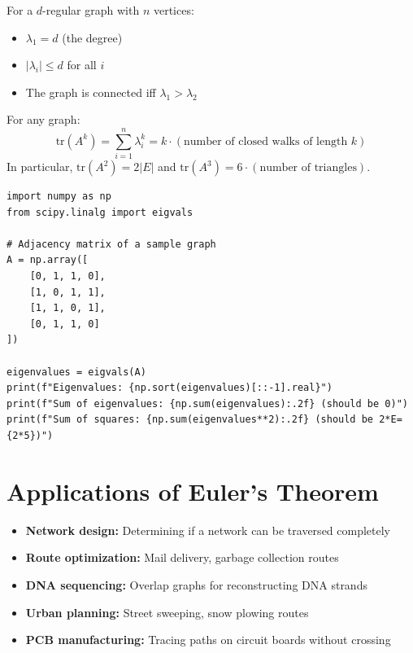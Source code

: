 \begin{theorem}
For a $d$-regular graph with $n$ vertices:
\begin{itemize}
\item $\lambda_1 = d$ (the degree)
\item $|\lambda_i| \leq d$ for all $i$
\item The graph is connected iff $\lambda_1 > \lambda_2$
\end{itemize}
\end{theorem}

\begin{theorem}
For any graph:
\[
\text{tr}(A^k) = \sum_{i=1}^{n} \lambda_i^k = k \cdot (\text{number of closed walks of length } k)
\]
In particular, $\text{tr}(A^2) = 2|E|$ and $\text{tr}(A^3) = 6 \cdot (\text{number of triangles})$.
\end{theorem}

\begin{lstlisting}[caption={Eigenvalue analysis of graph}, label=lst:eigenvalues]
import numpy as np
from scipy.linalg import eigvals

# Adjacency matrix of a sample graph
A = np.array([
    [0, 1, 1, 0],
    [1, 0, 1, 1],
    [1, 1, 0, 1],
    [0, 1, 1, 0]
])

eigenvalues = eigvals(A)
print(f"Eigenvalues: {np.sort(eigenvalues)[::-1].real}")
print(f"Sum of eigenvalues: {np.sum(eigenvalues):.2f} (should be 0)")
print(f"Sum of squares: {np.sum(eigenvalues**2):.2f} (should be 2*E={2*5})")
\end{lstlisting}

\section{Applications of Euler's Theorem}

\begin{itemize}
\item \textbf{Network design:} Determining if a network can be traversed completely
\item \textbf{Route optimization:} Mail delivery, garbage collection routes
\item \textbf{DNA sequencing:} Overlap graphs for reconstructing DNA strands
\item \textbf{Urban planning:} Street sweeping, snow plowing routes
\item \textbf{PCB manufacturing:} Tracing paths on circuit boards without crossing
\end{itemize}

